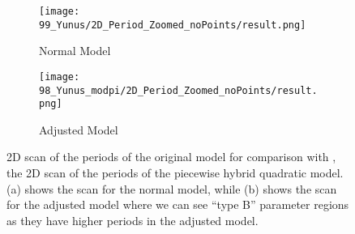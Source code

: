 \begin{figure}
	\centering
	\begin{subfigure}{0.4\textwidth}
		\centering
		\texttt{[image: 99\_Yunus/2D\_Period\_Zoomed\_noPoints/result.png]}
		\caption{Normal Model}
		\label{fig:setup.quad.hybrid.og.halved.full}
	\end{subfigure}
	\begin{subfigure}{0.4\textwidth}
		\centering
		\texttt{[image: 98\_Yunus\_modpi/2D\_Period\_Zoomed\_noPoints/result.png]}
		\caption{Adjusted Model}
		\label{fig:setup.quad.hybrid.og.halved}
	\end{subfigure}
	\caption[2D scan of the periods of the original model for comparison]{
		2D scan of the periods of the original model for comparison with , the 2D scan of the periods of the piecewise hybrid quadratic model.
		(a) shows the scan for the normal model, while (b) shows the scan for the adjusted model where we can see ``type B'' parameter regions as they have higher periods in the adjusted model.
	}
	\label{fig:setup.quad.hybrid.og}
\end{figure}
